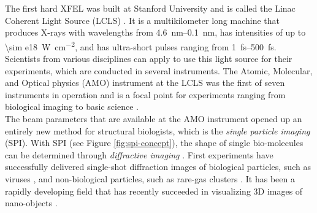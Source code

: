 %
The first hard XFEL was built at Stanford University and is called the Linac Coherent Light Source (LCLS) \citep{Emma-2010-NatPho}. It is a multikilometer long machine that produces X-rays with wavelengths from \SIrange{4.6}{0.1}{\nano\meter}, has intensities of up to \SI{\sim e18}{\watt\per\square\centi\meter}, and has ultra-short pulses ranging from \SIrange{1}{500}{\femto\second}. Scientists from various disciplines can apply to use this light source for their experiments, which are conducted in several instruments. The Atomic, Molecular, and Optical physics (AMO) instrument at the LCLS was the first of seven instruments in operation and is a focal point for experiments ranging from biological imaging to basic science \citep{Bostedt-2016-RMP}.\\[1\baselineskip]
%
The beam parameters that are available at the AMO instrument opened up an entirely new method for structural biologists, which is the \textit{single particle imaging} (SPI). With SPI (see Figure \ref{fig:spi-concept}), the shape of single bio-molecules can be determined through \textit{diffractive imaging} \citep{Chapman-2006-NatPhys}. First experiments have successfully delivered single-shot diffraction images of biological particles, such as viruses \citep{Seibert-2011-Nature}, and non-biological particles, such as rare-gas clusters \citep{Gomez-2014-Science}. It has been a rapidly developing field that has recently succeeded in visualizing 3D images of nano-objects \citep{Ekeberg-2015-PRL,Barke-2015-NatComm}.\\[1\baselineskip]
%
%

